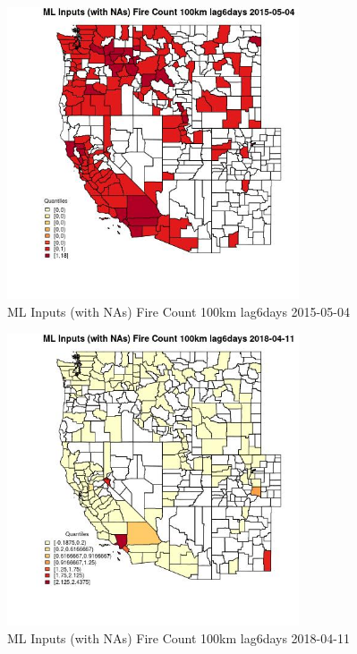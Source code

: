\begin{figure} 
\centering  
\includegraphics[width=0.77\textwidth]{Code_Outputs/Report_ML_input_PM25_Step4_part_e_de_duplicated_aves_compiled_2019-05-18wNAs_CountyFire_Count_100km_lag6daysMean2015-05-04_2015-05-04.jpg} 
\caption{\label{fig:Report_ML_input_PM25_Step4_part_e_de_duplicated_aves_compiled_2019-05-18wNAsCountyFire_Count_100km_lag6daysMean2015-05-04_2015-05-04}ML Inputs (with NAs) Fire Count 100km lag6days 2015-05-04} 
\end{figure} 
 

\begin{figure} 
\centering  
\includegraphics[width=0.77\textwidth]{Code_Outputs/Report_ML_input_PM25_Step4_part_e_de_duplicated_aves_compiled_2019-05-18wNAs_CountyFire_Count_100km_lag6daysMean2018-04-11_2018-04-11.jpg} 
\caption{\label{fig:Report_ML_input_PM25_Step4_part_e_de_duplicated_aves_compiled_2019-05-18wNAsCountyFire_Count_100km_lag6daysMean2018-04-11_2018-04-11}ML Inputs (with NAs) Fire Count 100km lag6days 2018-04-11} 
\end{figure} 
 

